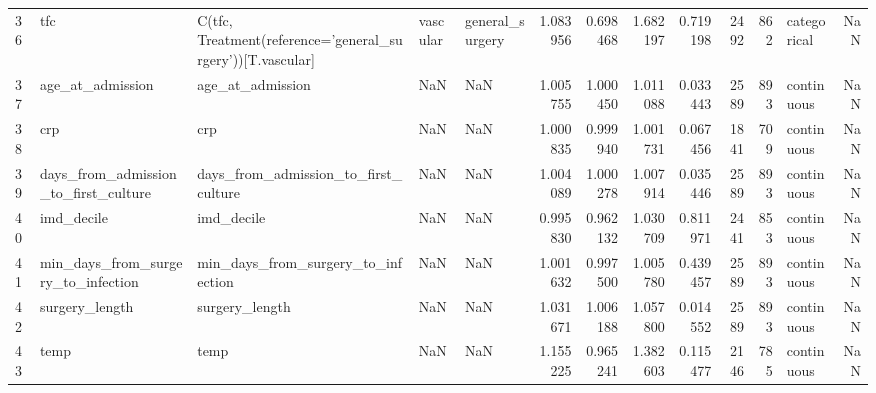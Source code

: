\begin{tabular}{lllllrrrrrrlr}
36 & tfc & C(tfc, Treatment(reference='general_surgery'))[T.vascular] & vascular & general_surgery & 1.083956 & 0.698468 & 1.682197 & 0.719198 & 2492 & 862 & categorical & NaN \\
37 & age_at_admission & age_at_admission & NaN & NaN & 1.005755 & 1.000450 & 1.011088 & 0.033443 & 2589 & 893 & continuous & NaN \\
38 & crp & crp & NaN & NaN & 1.000835 & 0.999940 & 1.001731 & 0.067456 & 1841 & 709 & continuous & NaN \\
39 & days_from_admission_to_first_culture & days_from_admission_to_first_culture & NaN & NaN & 1.004089 & 1.000278 & 1.007914 & 0.035446 & 2589 & 893 & continuous & NaN \\
40 & imd_decile & imd_decile & NaN & NaN & 0.995830 & 0.962132 & 1.030709 & 0.811971 & 2441 & 853 & continuous & NaN \\
41 & min_days_from_surgery_to_infection & min_days_from_surgery_to_infection & NaN & NaN & 1.001632 & 0.997500 & 1.005780 & 0.439457 & 2589 & 893 & continuous & NaN \\
42 & surgery_length & surgery_length & NaN & NaN & 1.031671 & 1.006188 & 1.057800 & 0.014552 & 2589 & 893 & continuous & NaN \\
43 & temp & temp & NaN & NaN & 1.155225 & 0.965241 & 1.382603 & 0.115477 & 2146 & 785 & continuous & NaN \\
\bottomrule
\end{tabular}
